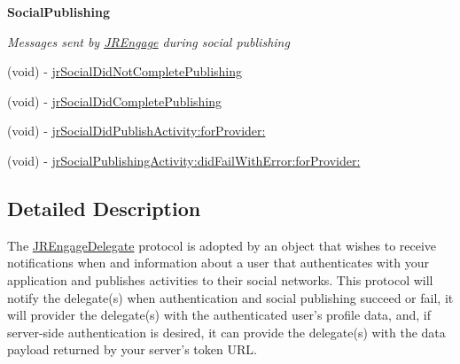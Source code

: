 \begin{Indent}{\bf SocialPublishing}\par
{\em \label{_amgrpeb046f03f7c48654b2974e7c81bd7f9b}
 Messages sent by \hyperlink{interface_j_r_engage}{JREngage} during social publishing }\begin{DoxyCompactItemize}
\item 
(void) -\/ \hyperlink{protocol_j_r_engage_delegate-p_a733007b584bd916932ccafe44c3c678d}{jrSocialDidNotCompletePublishing}
\item 
(void) -\/ \hyperlink{protocol_j_r_engage_delegate-p_ae90fea5db002559f6cf4e481080e0bfb}{jrSocialDidCompletePublishing}
\item 
(void) -\/ \hyperlink{protocol_j_r_engage_delegate-p_a4c3fd988961c22202786b400ddd889cc}{jrSocialDidPublishActivity:forProvider:}
\item 
(void) -\/ \hyperlink{protocol_j_r_engage_delegate-p_af6564add3b2fdbed2efbb118ddcf26ed}{jrSocialPublishingActivity:didFailWithError:forProvider:}
\end{DoxyCompactItemize}
\end{Indent}


\subsection{Detailed Description}
The \hyperlink{protocol_j_r_engage_delegate-p}{JREngageDelegate} protocol is adopted by an object that wishes to receive notifications when and information about a user that authenticates with your application and publishes activities to their social networks. This protocol will notify the delegate(s) when authentication and social publishing succeed or fail, it will provider the delegate(s) with the authenticated user's profile data, and, if server-\/side authentication is desired, it can provide the delegate(s) with the data payload returned by your server's token URL. 

